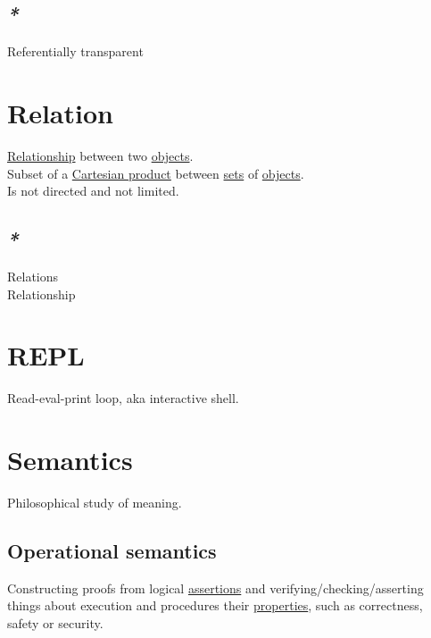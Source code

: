 \documentclass[a4paper,14pt,oneside]{book}
\begin{document}
\section{\emph{*}}
\label{sec:org0a4baa8}

\label{org5257b08}Referentially transparent\\

\chapter{\label{org70d7aba}Relation}
\label{sec:org8a39436}
\hyperref[org0718a13]{Relationship} between two \hyperref[org22f7883]{objects}.\\
Subset of a \hyperref[orge75e0a1]{Cartesian product} between \hyperref[org1faae0f]{sets} of \hyperref[org22f7883]{objects}.\\
Is not directed and not limited.\\

\section{\emph{*}}
\label{sec:org10d10e3}

\label{org7f47507}Relations\\
\label{org0718a13}Relationship\\

\chapter{\label{orgcc0f040}REPL}
\label{sec:org137b542}
Read-eval-print loop, aka interactive shell.\\

\chapter{\label{org322a4b8}Semantics}
\label{sec:org65b2b3a}
Philosophical study of meaning.\\

\section{\label{org3913d71}Operational semantics}
\label{sec:org9265190}
Constructing proofs from logical \hyperref[org3dd2f10]{assertions} and verifying/checking/asserting things about execution and procedures their \hyperref[org1feb373]{properties}, such as correctness, safety or security.\\
\end{document}
